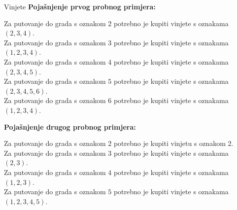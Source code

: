 \begin{statement}[
  problempoints=100,
  timelimit=3 sekunde,
  memorylimit=512 MiB,
]{Vinjete}
\textbf{Pojašnjenje prvog probnog primjera:}

Za putovanje do grada s oznakom $2$ potrebno je kupiti vinjete s oznakama $(2, 3, 4)$.\\
Za putovanje do grada s oznakom $3$ potrebno je kupiti vinjete s oznakama $(1, 2, 3, 4)$.\\
Za putovanje do grada s oznakom $4$ potrebno je kupiti vinjete s oznakama $(2, 3, 4, 5)$.\\
Za putovanje do grada s oznakom $5$ potrebno je kupiti vinjete s oznakama $(2, 3, 4, 5, 6)$.\\
Za putovanje do grada s oznakom $6$ potrebno je kupiti vinjete s oznakama $(1, 2, 3, 4)$.

\textbf{Pojašnjenje drugog probnog primjera:}

Za putovanje do grada s oznakom $2$ potrebno je kupiti vinjetu s oznakom $2$.\\
Za putovanje do grada s oznakom $3$ potrebno je kupiti vinjete s oznakama $(2, 3)$.\\
Za putovanje do grada s oznakom $4$ potrebno je kupiti vinjete s oznakama $(1, 2, 3)$.\\
Za putovanje do grada s oznakom $5$ potrebno je kupiti vinjete s oznakama $(1, 2, 3, 4, 5)$.
\end{statement}

